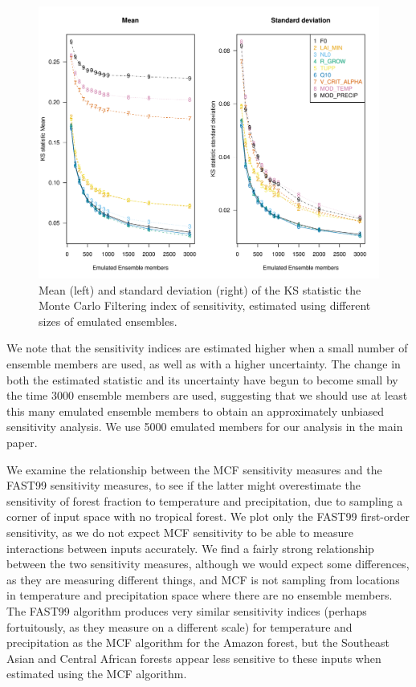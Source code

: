 \documentclass[gmd, manuscript]{copernicus} %
\begin{document}
\begin{figure}[t]
\includegraphics[width=12cm]{../graphics/mcf_mean_sd_vs_n.pdf}
\caption{ Mean (left) and standard deviation (right) of the KS statistic the Monte Carlo Filtering index of sensitivity, estimated using different sizes of emulated ensembles.}
\label{fig:mcf_mean_sd_vs_n}
\end{figure}

We note that the sensitivity indices are estimated higher when a small number of ensemble members are used, as well as with a higher uncertainty. The change in both the estimated statistic and its uncertainty have begun to become small by the time 3000 ensemble members are used, suggesting that we should use at least this many emulated ensemble members to obtain an approximately unbiased sensitivity analysis. We use 5000 emulated members for our analysis in the main paper.

We examine the relationship between the MCF sensitivity measures and the FAST99 sensitivity measures, to see if the latter might overestimate the sensitivity of forest fraction to temperature and precipitation, due to sampling a corner of input space with no tropical forest. We plot only the FAST99 first-order sensitivity, as we do not expect MCF sensitivity to be able to measure interactions between inputs accurately. We find a fairly strong relationship between the two sensitivity measures, although we would expect some differences, as they are measuring different things, and MCF is not sampling from locations in temperature and precipitation space where there are no ensemble members. The FAST99 algorithm produces very similar sensitivity indices (perhaps fortuitously, as they measure on a different scale) for temperature and precipitation as the MCF algorithm for the Amazon forest, but the Southeast Asian and Central African forests appear less sensitive to these inputs when estimated using the MCF algorithm.
\end{document}
